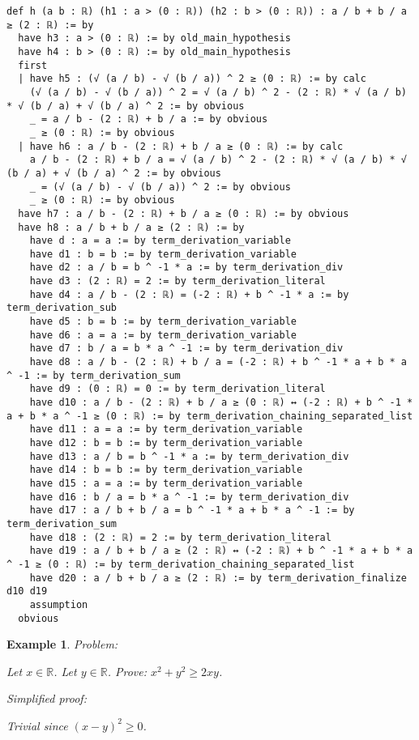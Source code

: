 \documentclass{article}
\newtheorem{example}{Example}
\begin{document}
\begin{tcolorbox}[colback=white!10, width=\linewidth]
\begin{lstlisting}[language=Lean4]
def h (a b : ℝ) (h1 : a > (0 : ℝ)) (h2 : b > (0 : ℝ)) : a / b + b / a ≥ (2 : ℝ) := by
  have h3 : a > (0 : ℝ) := by old_main_hypothesis
  have h4 : b > (0 : ℝ) := by old_main_hypothesis
  first
  | have h5 : (√ (a / b) - √ (b / a)) ^ 2 ≥ (0 : ℝ) := by calc
    (√ (a / b) - √ (b / a)) ^ 2 = √ (a / b) ^ 2 - (2 : ℝ) * √ (a / b) * √ (b / a) + √ (b / a) ^ 2 := by obvious
    _ = a / b - (2 : ℝ) + b / a := by obvious
    _ ≥ (0 : ℝ) := by obvious
  | have h6 : a / b - (2 : ℝ) + b / a ≥ (0 : ℝ) := by calc
    a / b - (2 : ℝ) + b / a = √ (a / b) ^ 2 - (2 : ℝ) * √ (a / b) * √ (b / a) + √ (b / a) ^ 2 := by obvious
    _ = (√ (a / b) - √ (b / a)) ^ 2 := by obvious
    _ ≥ (0 : ℝ) := by obvious
  have h7 : a / b - (2 : ℝ) + b / a ≥ (0 : ℝ) := by obvious
  have h8 : a / b + b / a ≥ (2 : ℝ) := by
    have d : a = a := by term_derivation_variable
    have d1 : b = b := by term_derivation_variable
    have d2 : a / b = b ^ -1 * a := by term_derivation_div
    have d3 : (2 : ℝ) = 2 := by term_derivation_literal
    have d4 : a / b - (2 : ℝ) = (-2 : ℝ) + b ^ -1 * a := by term_derivation_sub
    have d5 : b = b := by term_derivation_variable
    have d6 : a = a := by term_derivation_variable
    have d7 : b / a = b * a ^ -1 := by term_derivation_div
    have d8 : a / b - (2 : ℝ) + b / a = (-2 : ℝ) + b ^ -1 * a + b * a ^ -1 := by term_derivation_sum
    have d9 : (0 : ℝ) = 0 := by term_derivation_literal
    have d10 : a / b - (2 : ℝ) + b / a ≥ (0 : ℝ) ↔ (-2 : ℝ) + b ^ -1 * a + b * a ^ -1 ≥ (0 : ℝ) := by term_derivation_chaining_separated_list
    have d11 : a = a := by term_derivation_variable
    have d12 : b = b := by term_derivation_variable
    have d13 : a / b = b ^ -1 * a := by term_derivation_div
    have d14 : b = b := by term_derivation_variable
    have d15 : a = a := by term_derivation_variable
    have d16 : b / a = b * a ^ -1 := by term_derivation_div
    have d17 : a / b + b / a = b ^ -1 * a + b * a ^ -1 := by term_derivation_sum
    have d18 : (2 : ℝ) = 2 := by term_derivation_literal
    have d19 : a / b + b / a ≥ (2 : ℝ) ↔ (-2 : ℝ) + b ^ -1 * a + b * a ^ -1 ≥ (0 : ℝ) := by term_derivation_chaining_separated_list
    have d20 : a / b + b / a ≥ (2 : ℝ) := by term_derivation_finalize d10 d19
    assumption
  obvious

\end{lstlisting}
\end{tcolorbox}


\begin{example}
Problem:
\begin{tcolorbox}[colback=yellow!10, width=\linewidth]
Let $x\in\mathbb{R}$. Let $y\in\mathbb{R}$.
    Prove: $x^2 + y^2 \ge 2xy$.
\end{tcolorbox}

Simplified proof:
\begin{tcolorbox}[colback=blue!10, width=\linewidth]
Trivial since $(x-y)^2 \ge 0$.
\end{tcolorbox}
\end{example}
\end{document}
